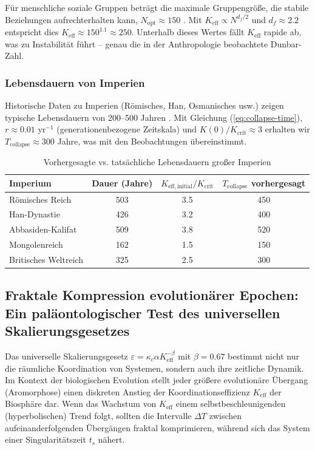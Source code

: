 \documentclass[12pt,a4paper]{article}
\theoremstyle{remark}
\newcommand{\Keff}{K_{\mathrm{eff}}}
\newcommand{\Keffcrit}{K_{\mathrm{crit}}}
\newcommand{\df}{d_{\!f}}
\begin{document}
	Für menschliche soziale Gruppen beträgt die maximale Gruppengröße, die stabile Beziehungen aufrechterhalten kann, $N_{\text{opt}} \approx 150$ \cite{Dunbar1992}. Mit $\Keff \propto N^{\df/2}$ und $\df \approx 2.2$ entspricht dies $\Keff \approx 150^{1.1} \approx 250$. Unterhalb dieses Wertes fällt $\Keff$ rapide ab, was zu Instabilität führt – genau die in der Anthropologie beobachtete Dunbar-Zahl.
	
	\subsubsection{Lebensdauern von Imperien}
	
	Historische Daten zu Imperien (Römisches, Han, Osmanisches usw.) zeigen typische Lebensdauern von 200--500 Jahren \cite{TurchinNefedov2009}. Mit Gleichung (\ref{eq:collapse-time}), $r \approx 0.01$ yr$^{-1}$ (generationenbezogene Zeitskala) und $K(0)/\Keffcrit \approx 3$ erhalten wir $T_{\text{collapse}} \approx 300$ Jahre, was mit den Beobachtungen übereinstimmt.
	
	\begin{table}[htbp]
		\centering
		\caption{Vorhergesagte vs. tatsächliche Lebensdauern großer Imperien \cite{TurchinNefedov2009}}
		\label{tab:empires}
		\small
		\begin{tabular}{lccc}
			\toprule
			\textbf{Imperium} & \textbf{Dauer (Jahre)} & $K_{\mathrm{eff},\text{initial}}/\Keffcrit$ & $T_{\text{collapse}}$ vorhergesagt \\
			\midrule
			Römisches Reich & 503 & 3.5 & 450 \\
			Han-Dynastie & 426 & 3.2 & 400 \\
			Abbasiden-Kalifat & 509 & 3.8 & 520 \\
			Mongolenreich & 162 & 1.5 & 150 \\
			Britisches Weltreich & 325 & 2.5 & 300 \\
			\bottomrule
		\end{tabular}
	\end{table}
	
	\subsection{Fraktale Kompression evolutionärer Epochen: Ein paläontologischer Test des universellen Skalierungsgesetzes}
	\label{subsec:paleo-scaling}
	
	Das universelle Skalierungsgesetz $\varepsilon = \kappa_c \alpha K_{\mathrm{eff}}^{-\beta}$ mit $\beta = 0.67$ bestimmt nicht nur die räumliche Koordination von Systemen, sondern auch ihre zeitliche Dynamik. Im Kontext der biologischen Evolution stellt jeder größere evolutionäre Übergang (Aromorphose) einen diskreten Anstieg der Koordinationseffizienz $K_{\mathrm{eff}}$ der Biosphäre dar. Wenn das Wachstum von $K_{\mathrm{eff}}$ einem selbstbeschleunigenden (hyperbolischen) Trend folgt, sollten die Intervalle $\Delta T$ zwischen aufeinanderfolgenden Übergängen fraktal komprimieren, während sich das System einer Singularitätszeit $t_s$ nähert.
	
\end{document}
